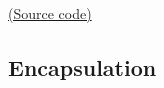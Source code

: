 \documentclass[10pt,compress]{beamer} %
\begin{document}

\begin{frame}[plain]%
	\begin{exampleblock}{}
	\vspace{-0.3cm} 
		
	\end{exampleblock}

	\href{https://gist.github.com/dfbarrero/0b401926b92a5e36ad08a3eae5fbd16c}{(Source code)}
\end{frame}


	
%		

\subsection{Encapsulation}
\end{document}
